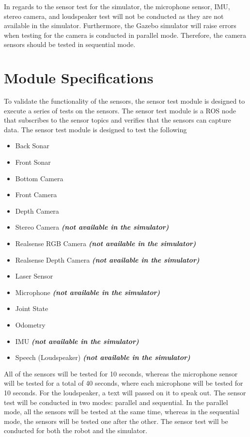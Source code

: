 \documentclass{CSSRforAfrica}
\begin{document}
In regards to the sensor test for the simulator, the microphone sensor, IMU, stereo camera, and loudspeaker
test will not be conducted as they are not available in the simulator. Furthermore, the Gazebo simulator 
will raise errors when testing for the camera is conducted in parallel mode. Therefore, the camera sensors 
should be tested in sequential mode.
\newpage

\section{Module Specifications}
To validate the functionality of the sensors, the sensor test module is designed to execute a series of tests
on the sensors. The sensor test module is a ROS node that subscribes to the sensor topics and verifies that the
sensors can capture data. The sensor test module is designed to test the following 


\begin{itemize}
	\setlength\itemsep{0em}
	\item Back Sonar
	\item Front Sonar
	\item Bottom Camera
	\item Front Camera
	\item Depth Camera
	\item Stereo Camera \textbf{\textit{(not available in the simulator)}}
	\item Realsense RGB Camera \textbf{\textit{(not available in the simulator)}}
	\item Realsense Depth Camera \textbf{\textit{(not available in the simulator)}}
	\item Laser Sensor
	\item Microphone \textbf{\textit{(not available in the simulator)}}
	\item Joint State
	\item Odometry
	\item IMU \textbf{\textit{(not available in the simulator)}}
	\item Speech (Loudspeaker) \textbf{\textit{(not available in the simulator)}}
\end{itemize}

All of the sensors will be tested for 10 seconds, whereas the microphone sensor will be tested for a total of 40 seconds, where each microphone will be tested for 10 seconds.
For the loudspeaker, a text will passed on it to speak out. The sensor test will be conducted in two modes: parallel and sequential.
In the parallel mode, all the sensors will be tested at the same time, whereas in the sequential mode, the sensors will be tested one after the other.
The sensor test will be conducted for both the robot and the simulator.
\end{document}
